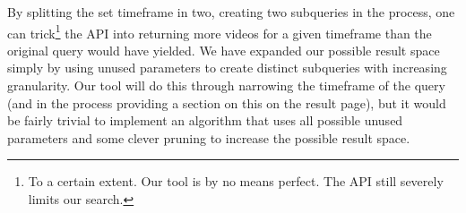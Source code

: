 By splitting the set timeframe in two, creating two subqueries in the process,
one can trick\footnote{To a certain extent. Our tool is by no means perfect. The
API still severely limits our search.} the API into returning more videos for a given
timeframe than the original query would have yielded. We have expanded our
possible result space simply by using unused parameters to create distinct
subqueries with increasing granularity.
Our tool will do this through narrowing the timeframe of the query (and
in the process providing a section on this on the result page), but
it would be fairly trivial to implement an algorithm that uses all possible
unused parameters and some clever pruning to increase the possible result space.

